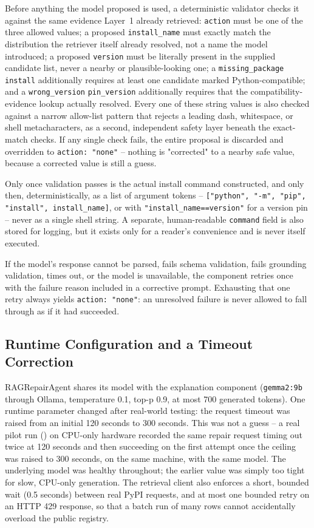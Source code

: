 Before anything the model proposed is used, a deterministic validator
checks it against the same evidence Layer~1 already retrieved:
\texttt{action} must be one of the three allowed values; a proposed
\texttt{install\_name} must exactly match the distribution the retriever
itself already resolved, not a name the model introduced; a proposed
\texttt{version} must be literally present in the supplied candidate list,
never a nearby or plausible-looking one; a \texttt{missing\_package}
\texttt{install} additionally requires at least one candidate marked
Python-compatible; and a \texttt{wrong\_version} \texttt{pin\_version}
additionally requires that the compatibility-evidence lookup actually
resolved. Every one of these string values is also checked against a narrow
allow-list pattern that rejects a leading dash, whitespace, or shell
metacharacters, as a second, independent safety layer beneath the exact-match
checks. If any single check fails, the entire proposal is discarded and
overridden to \texttt{action: "none"} -- nothing is "corrected" to a nearby
safe value, because a corrected value is still a guess.

Only once validation passes is the actual install command constructed, and
only then, deterministically, as a list of argument tokens --
\texttt{["python", "-m", "pip", "install", install\_name]}, or with
\texttt{"install\_name==version"} for a version pin -- never as a single
shell string. A separate, human-readable \texttt{command} field is also
stored for logging, but it exists only for a reader's convenience and is
never itself executed.

If the model's response cannot be parsed, fails schema validation, fails
grounding validation, times out, or the model is unavailable, the component
retries once with the failure reason included in a corrective prompt.
Exhausting that one retry always yields \texttt{action: "none"}: an
unresolved failure is never allowed to fall through as if it had succeeded.

\subsection{Runtime Configuration and a Timeout Correction}

RAGRepairAgent shares its model with the explanation component
(\texttt{gemma2:9b} through Ollama, temperature 0.1, top-p 0.9, at most 700
generated tokens). One runtime parameter changed after real-world testing: the
request timeout was raised from an initial 120 seconds to 300 seconds. This
was not a guess -- a real pilot run () on CPU-only
hardware recorded the same repair request timing out twice at 120 seconds
and then succeeding on the first attempt once the ceiling was raised to 300
seconds, on the same machine, with the same model. The underlying model was
healthy throughout; the earlier value was simply too tight for slow,
CPU-only generation. The retrieval client also enforces a short, bounded
wait (0.5 seconds) between real PyPI requests, and at most one bounded retry
on an HTTP 429 response, so that a batch run of many rows cannot
accidentally overload the public registry.

